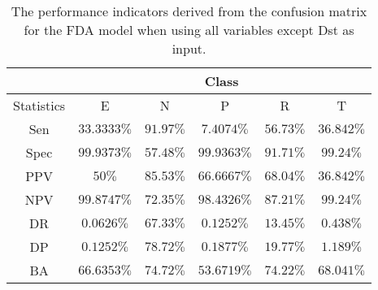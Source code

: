 \begin{table}[!ht]
	\centering
	\begin{tabular}{|c|c|c|c|c|c|}
		\hline
		 & \multicolumn{5}{c|}{Class} \\ \hline
		Statistics & E & N & P & R & T \\ \hline
		Sen & $33.3333\%$ & $91.97\%$ & $7.4074\%$ & $56.73\%$ & $36.842\%$ \\ \hline
		Spec & $99.9373\%$ & $57.48\%$ & $99.9363\%$ & $91.71\%$ & $99.24\%$ \\ \hline
		PPV & $50\%$ & $85.53\%$ & $66.6667\%$ & $68.04\%$ & $36.842\%$ \\ \hline
		NPV & $99.8747\%$ & $72.35\%$ & $98.4326\%$ & $87.21\%$ & $99.24\%$ \\ \hline
		DR & $0.0626\%$ & $67.33\%$ & $0.1252\%$ & $13.45\%$ & $0.438\%$ \\ \hline
		DP & $0.1252\%$ & $78.72\%$ & $0.1877\%$ & $19.77\%$ & $1.189\%$ \\ \hline
		BA & $66.6353\%$ & $74.72\%$ & $53.6719\%$ & $74.22\%$ & $68.041\%$ \\ \hline
	\end{tabular}
	\caption{The performance indicators derived from the confusion matrix for the FDA model when using all variables except Dst as input.}
	\label{tab:cs:reverse:noDst:fda}
\end{table}
